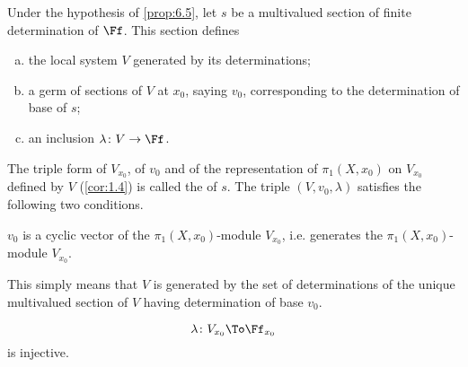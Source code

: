 \begin{para}\label{hypothesis:6.8}
  Under the hypothesis of \ref{prop:6.5}, let $s$ be a multivalued section of
  finite determination of $\Ff$. This section defines
  \begin{enumerate}[a)]
    \item the local system $V$ generated by its determinations;
    \item a germ of sections of $V$ at $x_0$, saying $v_0$, corresponding to
    the determination of base of $s$;
    \item an inclusion $\lambda\colon V\to\Ff$.
  \end{enumerate}

  The triple form of $V_{x_0}$, of $v_0$ and of the representation of
  $\pi_1(X,x_0)$ on $V_{x_0}$ defined by $V$ (\ref{cor:1.4})
  is called the  of $s$.
  The triple $(V,v_0,\lambda)$ satisfies the following two conditions.
  \begin{subpara}
    $v_0$ is a cyclic vector of the $\pi_1(X,x_0)$-module $V_{x_0}$, i.e.
    generates the $\pi_1(X,x_0)$-module $V_{x_0}$.
  \end{subpara}

  This simply means that $V$ is generated by the set of determinations of the
  unique multivalued section of $V$ having determination of base $v_0$.

  \begin{subpara}
    \[
    \lambda\colon V_{x_0}\To\Ff_{x_0}
    \]
    is injective.
  \end{subpara}
\end{para}

